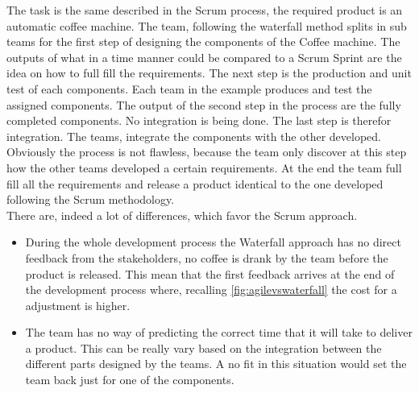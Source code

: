 \documentclass[../main.tex]{subfiles}
\begin{document}
The task is the same described in the Scrum process, the required product is an automatic coffee machine. The team, following the waterfall method splits in sub teams for the first step of designing the components of the Coffee machine. The outputs of what in a time manner could be compared to a Scrum Sprint are the idea on how to full fill the requirements. The next step is the production and unit test of each components. Each team in the example produces and test the assigned components. The output of the second step in the process are the fully completed components. No integration is being done. The last step is therefor integration. The teams, integrate the components with the other developed. Obviously the process is not flawless, because the team only discover at this step how the other teams developed a certain requirements. At the end the team full fill all the requirements and release a product identical to the one developed following the Scrum methodology.\\ There are, indeed a lot of differences, which favor the Scrum approach.
\begin{itemize}
    \item During the whole development process the Waterfall approach has no direct feedback from the stakeholders, no coffee is drank by the team before the product is released. This mean that the first feedback arrives at the end of the development process where, recalling \ref{fig:agilevswaterfall} the cost for a adjustment is higher. 
    \item The team has no way of predicting the correct time that it will take to deliver a product. This can be really vary based on the integration between the different parts designed by the teams. A no fit in this situation would set the team back just for one of the components. 
\end{itemize}
\cleardoublepage
\end{document}
